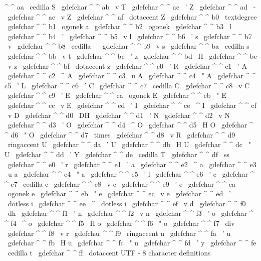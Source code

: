 {{{{{^
^
aa
{
\
cedilla
S
}
\
gdefchar
^
^
ab
{
\
v
T
}
\
gdefchar
^
^
ac
{
\
'
Z
}
\
gdefchar
^
^
ad
{
\
-
}
\
gdefchar
^
^
ae
{
\
v
Z
}
\
gdefchar
^
^
af
{
\
dotaccent
Z
}
%
\
gdefchar
^
^
b0
{
\
textdegree
{
}
}
\
gdefchar
^
^
b1
{
\
ogonek
{
a
}
}
\
gdefchar
^
^
b2
{
\
ogonek
{
}
}
\
gdefchar
^
^
b3
{
\
l
}
\
gdefchar
^
^
b4
{
\
'
{
}
}
\
gdefchar
^
^
b5
{
\
v
l
}
\
gdefchar
^
^
b6
{
\
'
s
}
\
gdefchar
^
^
b7
{
\
v
{
}
}
\
gdefchar
^
^
b8
{
\
cedilla
\
}
\
gdefchar
^
^
b9
{
\
v
s
}
\
gdefchar
^
^
ba
{
\
cedilla
s
}
\
gdefchar
^
^
bb
{
\
v
t
}
\
gdefchar
^
^
bc
{
\
'
z
}
\
gdefchar
^
^
bd
{
\
H
{
}
}
\
gdefchar
^
^
be
{
\
v
z
}
\
gdefchar
^
^
bf
{
\
dotaccent
z
}
%
\
gdefchar
^
^
c0
{
\
'
R
}
\
gdefchar
^
^
c1
{
\
'
A
}
\
gdefchar
^
^
c2
{
\
^
A
}
\
gdefchar
^
^
c3
{
\
u
A
}
\
gdefchar
^
^
c4
{
\
"
A
}
\
gdefchar
^
^
c5
{
\
'
L
}
\
gdefchar
^
^
c6
{
\
'
C
}
\
gdefchar
^
^
c7
{
\
cedilla
C
}
\
gdefchar
^
^
c8
{
\
v
C
}
\
gdefchar
^
^
c9
{
\
'
E
}
\
gdefchar
^
^
ca
{
\
ogonek
{
E
}
}
\
gdefchar
^
^
cb
{
\
"
E
}
\
gdefchar
^
^
cc
{
\
v
E
}
\
gdefchar
^
^
cd
{
\
'
I
}
\
gdefchar
^
^
ce
{
\
^
I
}
\
gdefchar
^
^
cf
{
\
v
D
}
%
\
gdefchar
^
^
d0
{
\
DH
}
\
gdefchar
^
^
d1
{
\
'
N
}
\
gdefchar
^
^
d2
{
\
v
N
}
\
gdefchar
^
^
d3
{
\
'
O
}
\
gdefchar
^
^
d4
{
\
^
O
}
\
gdefchar
^
^
d5
{
\
H
O
}
\
gdefchar
^
^
d6
{
\
"
O
}
\
gdefchar
^
^
d7
{
\
times
}
\
gdefchar
^
^
d8
{
\
v
R
}
\
gdefchar
^
^
d9
{
\
ringaccent
U
}
\
gdefchar
^
^
da
{
\
'
U
}
\
gdefchar
^
^
db
{
\
H
U
}
\
gdefchar
^
^
dc
{
\
"
U
}
\
gdefchar
^
^
dd
{
\
'
Y
}
\
gdefchar
^
^
de
{
\
cedilla
T
}
\
gdefchar
^
^
df
{
\
ss
}
%
\
gdefchar
^
^
e0
{
\
'
r
}
\
gdefchar
^
^
e1
{
\
'
a
}
\
gdefchar
^
^
e2
{
\
^
a
}
\
gdefchar
^
^
e3
{
\
u
a
}
\
gdefchar
^
^
e4
{
\
"
a
}
\
gdefchar
^
^
e5
{
\
'
l
}
\
gdefchar
^
^
e6
{
\
'
c
}
\
gdefchar
^
^
e7
{
\
cedilla
c
}
\
gdefchar
^
^
e8
{
\
v
c
}
\
gdefchar
^
^
e9
{
\
'
e
}
\
gdefchar
^
^
ea
{
\
ogonek
{
e
}
}
\
gdefchar
^
^
eb
{
\
"
e
}
\
gdefchar
^
^
ec
{
\
v
e
}
\
gdefchar
^
^
ed
{
\
'
{
\
dotless
{
i
}
}
}
\
gdefchar
^
^
ee
{
\
^
{
\
dotless
{
i
}
}
}
\
gdefchar
^
^
ef
{
\
v
d
}
%
\
gdefchar
^
^
f0
{
\
dh
}
\
gdefchar
^
^
f1
{
\
'
n
}
\
gdefchar
^
^
f2
{
\
v
n
}
\
gdefchar
^
^
f3
{
\
'
o
}
\
gdefchar
^
^
f4
{
\
^
o
}
\
gdefchar
^
^
f5
{
\
H
o
}
\
gdefchar
^
^
f6
{
\
"
o
}
\
gdefchar
^
^
f7
{
\
div
}
\
gdefchar
^
^
f8
{
\
v
r
}
\
gdefchar
^
^
f9
{
\
ringaccent
u
}
\
gdefchar
^
^
fa
{
\
'
u
}
\
gdefchar
^
^
fb
{
\
H
u
}
\
gdefchar
^
^
fc
{
\
"
u
}
\
gdefchar
^
^
fd
{
\
'
y
}
\
gdefchar
^
^
fe
{
\
cedilla
t
}
\
gdefchar
^
^
ff
{
\
dotaccent
{
}
}
}
%
UTF
-
8
character
definitions
}}}}
